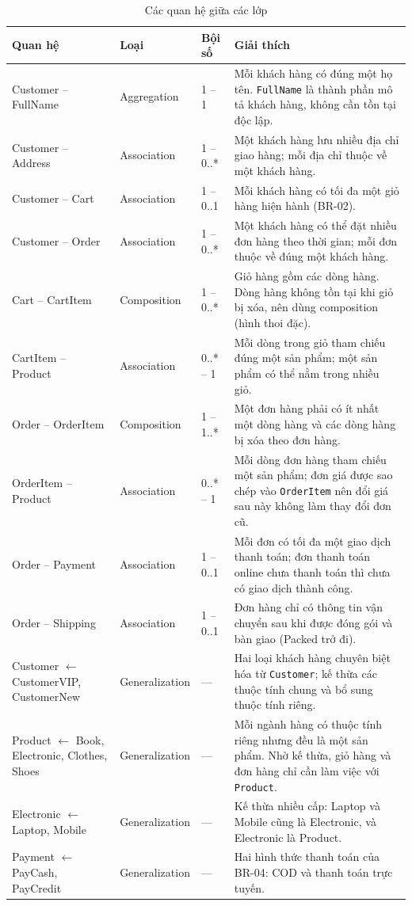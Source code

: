 \documentclass[12pt,a4paper,oneside]{report}
\begin{document}
\begin{longtable}{p{3.4cm}p{2.6cm}p{2.2cm}p{7.6cm}}
\caption{Các quan hệ giữa các lớp}\\
\toprule
\textbf{Quan hệ} & \textbf{Loại} & \textbf{Bội số} & \textbf{Giải thích} \\
\midrule
\endhead
\bottomrule
\endlastfoot
Customer -- FullName & Aggregation & 1 -- 1 & Mỗi khách hàng có đúng một họ tên. \texttt{FullName} là thành phần mô tả khách hàng, không cần tồn tại độc lập. \\
Customer -- Address & Association & 1 -- 0..* & Một khách hàng lưu nhiều địa chỉ giao hàng; mỗi địa chỉ thuộc về một khách hàng. \\
Customer -- Cart & Association & 1 -- 0..1 & Mỗi khách hàng có tối đa một giỏ hàng hiện hành (BR-02). \\
Customer -- Order & Association & 1 -- 0..* & Một khách hàng có thể đặt nhiều đơn hàng theo thời gian; mỗi đơn thuộc về đúng một khách hàng. \\
Cart -- CartItem & Composition & 1 -- 0..* & Giỏ hàng gồm các dòng hàng. Dòng hàng không tồn tại khi giỏ bị xóa, nên dùng composition (hình thoi đặc). \\
CartItem -- Product & Association & 0..* -- 1 & Mỗi dòng trong giỏ tham chiếu đúng một sản phẩm; một sản phẩm có thể nằm trong nhiều giỏ. \\
Order -- OrderItem & Composition & 1 -- 1..* & Một đơn hàng phải có ít nhất một dòng hàng và các dòng hàng bị xóa theo đơn hàng. \\
OrderItem -- Product & Association & 0..* -- 1 & Mỗi dòng đơn hàng tham chiếu một sản phẩm; đơn giá được sao chép vào \texttt{OrderItem} nên đổi giá sau này không làm thay đổi đơn cũ. \\
Order -- Payment & Association & 1 -- 0..1 & Mỗi đơn có tối đa một giao dịch thanh toán; đơn thanh toán online chưa thanh toán thì chưa có giao dịch thành công. \\
Order -- Shipping & Association & 1 -- 0..1 & Đơn hàng chỉ có thông tin vận chuyển sau khi được đóng gói và bàn giao (Packed trở đi). \\
Customer $\leftarrow$ CustomerVIP, CustomerNew & Generalization & --- & Hai loại khách hàng chuyên biệt hóa từ \texttt{Customer}; kế thừa các thuộc tính chung và bổ sung thuộc tính riêng. \\
Product $\leftarrow$ Book, Electronic, Clothes, Shoes & Generalization & --- & Mỗi ngành hàng có thuộc tính riêng nhưng đều là một sản phẩm. Nhờ kế thừa, giỏ hàng và đơn hàng chỉ cần làm việc với \texttt{Product}. \\
Electronic $\leftarrow$ Laptop, Mobile & Generalization & --- & Kế thừa nhiều cấp: Laptop và Mobile cũng là Electronic, và Electronic là Product. \\
Payment $\leftarrow$ PayCash, PayCredit & Generalization & --- & Hai hình thức thanh toán của BR-04: COD và thanh toán trực tuyến. \\
\end{longtable}
\end{document}
